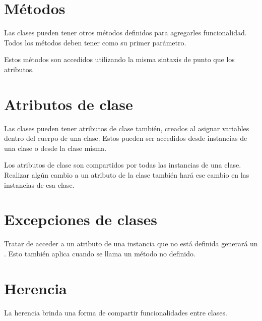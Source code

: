\section{Métodos}

Las clases pueden tener otros métodos definidos para agregarles funcionalidad.
Todos los métodos deben tener  como su primer parámetro.
\medskip

Estos métodos son accedidos utilizando la misma sintaxis de punto que los atributos.


\section{Atributos de clase}

Las clases pueden tener atributos de clase también, creados al asignar variables dentro del cuerpo de una clase.
Estos pueden ser accedidos desde instancias de una clase o desde la clase misma.


Los atributos de clase son compartidos por todas las instancias de una clase.
Realizar algún cambio a un atributo de la clase también hará ese cambio en las instancias de esa clase.


\section{Excepciones de clases}

Tratar de acceder a un atributo de una instancia que no está definida generará un .
Esto también aplica cuando se llama un método no definido.



\section{Herencia}

La herencia brinda una forma de compartir funcionalidades entre clases.
\medskip


